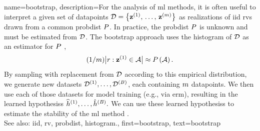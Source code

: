 {name={bootstrap},
	description={For the analysis of \gls{ml} methods, it is often useful to interpret 
		a given set of \glspl{datapoint} $\mathcal{D} = \big\{ {\bf z}^{(1)}, \,\ldots, \,{\bf z}^{(m)}\big\}$ 
		as \glspl{realization} of \gls{iid} \glspl{rv} drawn from a common \gls{probdist} $P$. 
		In practice, the \gls{probdist} $P$ is unknown and must be estimated from $\mathcal{D}$. 
		The bootstrap approach uses the \gls{histogram} of $\mathcal{D}$ as an estimator for 
		$P$ \cite{hastie01statisticallearning}, 
		$$ (1/m) \big| r: {\bf z}^{(1)} \in \mathcal{A} \big| \approx P\left(\mathcal{A}\right).$$
		By sampling with replacement from $\mathcal{D}$ according to this empirical distribution, 
		we generate new \glspl{dataset} 
		$\mathcal{D}^{(1)}, \ldots, \mathcal{D}^{(B)}$, each containing 
		$m$ \glspl{datapoint}. We then use each of those \glspl{dataset} 
		for \gls{model} \gls{training} (e.g., via \gls{erm}), 
		resulting in the learned \glspl{hypothesis}
		$\widehat{h}^{(1)}, \ldots, \hat{h}^{(B)}.$ 
        We can use these learned \glspl{hypothesis} to estimate the \gls{stability} 
		of the \gls{ml} method \cite{hastie01statisticallearning}.
		\\
		See also: \gls{iid}, \gls{rv}, \gls{probdist}, \gls{histogram}.},
	first={bootstrap},
	text={bootstrap}  
}

